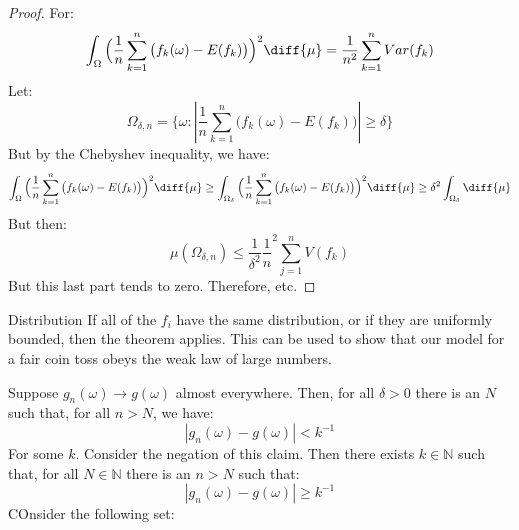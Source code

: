     \begin{proof}
        For:
        \begin{equation}
            \int_{\Omega}\Big(\frac{1}{n}\sum_{k=1}^{n}\big(
                f_{k}(\omega)-E(f_{k})\big)\Big)^{2}\diff{\mu}
            =\frac{1}{n^{2}}\sum_{k=1}^{n}Var(f_{k})
        \end{equation}
        Let:
        \begin{equation}
            \Omega_{\delta,n}=
            \{\omega:|\frac{1}{n}\sum_{k=1}^{n}
                \big(f_{k}(\omega)-E(f_{k})\big)|\geq\delta\}
        \end{equation}
        But by the Chebyshev inequality, we have:
        \begin{equation}
            \int_{\Omega}\Big(\frac{1}{n}\sum_{k=1}^{n}\big(
                f_{k}(\omega)-E(f_{k})\big)\Big)^{2}\diff{\mu}
            \geq\int_{\Omega_{\delta}}
                \Big(\frac{1}{n}\sum_{k=1}^{n}\big(
                f_{k}(\omega)-E(f_{k})\big)\Big)^{2}\diff{\mu}
            \geq\delta^{2}\int_{\Omega_{\delta}}\diff{\mu}
        \end{equation}
        But then:
        \begin{equation}
            \mu(\Omega_{\delta,n})\leq
            \frac{1}{\delta^{2}}\frac{1}{n}^{2}
            \sum_{j=1}^{n}V(f_{k})
        \end{equation}
        But this last part tends to zero. Therefore, etc.
    \end{proof}
    \begin{lexample}{}{Distribution}
        If all of the $f_{i}$ have the same distribution, or
        if they are uniformly bounded, then the theorem applies.
        This can be used to show that our model for a fair
        coin toss obeys the weak law of large numbers.
    \end{lexample}
    Suppose $g_{n}(\omega)\rightarrow{g}(\omega)$ almost
    everywhere. Then, for all $\delta>0$ there is an
    $N$ such that, for all $n>N$, we have:
    \begin{equation}
        |g_{n}(\omega)-g(\omega)|<k^{\minus{1}}
    \end{equation}
    For some $k$. Consider the negation of this claim. Then
    there exists $k\in\mathbb{N}$ such that, for all
    $N\in\mathbb{N}$ there is an $n>N$ such that:
    \begin{equation}
        |g_{n}(\omega)-g(\omega)|\geq{k}^{\minus{1}}
    \end{equation}
    COnsider the following set:
